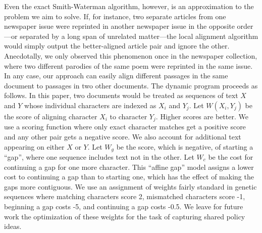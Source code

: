 \documentclass[pdftex,11pt]{article}
\begin{document}
Even the exact Smith-Waterman algorithm, however, is an approximation
to the problem we aim to solve.  If, for instance, two separate
articles from one newspaper issue were reprinted in another newspaper
issue in the opposite order---or separated by a long span of unrelated
matter---the local alignment algorithm would simply output the
better-aligned article pair and ignore the other.  Anecdotally, we
only observed this phenomenon once in the newspaper collection, where
two different parodies of the same poem were reprinted in the same
issue.  In any case, our approach can easily align different passages
in the same document to passages in two other documents.
The dynamic program proceeds as follows.  In this paper, two documents
would be treated as sequences of text $X$ and $Y$ whose individual
characters are indexed as $X_i$ and $Y_j$. Let $W(X_i, Y_j)$ be the
score of aligning character $X_i$ to character $Y_j$.  Higher scores
are better.  We use a scoring function where only exact character
matches get a positive score and any other pair gets a negative score.
We also account for additional text appearing on either $X$ or $Y$.
Let $W_g$ be the score, which is negative, of starting a ``gap'',
where one sequence includes text not in the other.  Let $W_c$ be the
cost for continuing a gap for one more character.  This ``affine gap''
model assigns a lower cost to continuing a gap than to starting one,
which has the effect of making the gaps more contiguous.  We use an
assignment of weights fairly standard in genetic sequences where
matching characters score 2, mismatched characters score -1, beginning
a gap costs -5, and continuing a gap costs -0.5.  We leave for future
work the optimization of these weights for the task of capturing
shared policy ideas.
\end{document}
